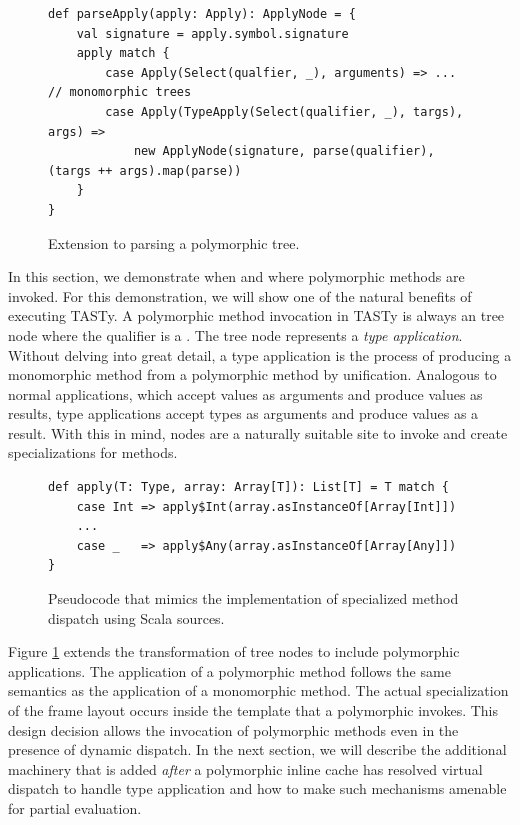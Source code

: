 \begin{figure}[!htb]
\begin{verbatim}
def parseApply(apply: Apply): ApplyNode = {
	val signature = apply.symbol.signature
	apply match {
		case Apply(Select(qualfier, _), arguments) => ... // monomorphic trees
		case Apply(TypeApply(Select(qualifier, _), targs), args) =>
			new ApplyNode(signature, parse(qualifier), (targs ++ args).map(parse))
	}
}
\end{verbatim}
\caption{Extension to parsing a polymorphic  tree.}
\label{impl:parse-typeapply}
\end{figure}

In this section, we demonstrate when and where polymorphic methods are invoked.
For this demonstration, we will show one of the natural benefits of executing TASTy.
A polymorphic method invocation in TASTy is always an  tree node where the qualifier is a .
The  tree node represents a \textit{type application}.
Without delving into great detail, a type application is the process of producing a monomorphic method from a polymorphic method by unification.
Analogous to normal applications, which accept values as arguments and produce values as results, type applications accept types as arguments and produce values as a result.
With this in mind,  nodes are a naturally suitable site to invoke and create specializations for methods.

\begin{figure}[!htb]
\begin{verbatim}
def apply(T: Type, array: Array[T]): List[T] = T match {
	case Int => apply$Int(array.asInstanceOf[Array[Int]])
	...
	case _   => apply$Any(array.asInstanceOf[Array[Any]])
}
\end{verbatim}
\caption{Pseudocode that mimics the implementation of specialized method dispatch using Scala sources.}
\end{figure}

Figure \ref{impl:parse-typeapply} extends the transformation of  tree nodes to include polymorphic applications.
The application of a polymorphic method follows the same semantics as the application of a monomorphic method.
The actual specialization of the frame layout occurs inside the template that a polymorphic  invokes.
This design decision allows the invocation of polymorphic methods even in the presence of dynamic dispatch.
In the next section, we will describe the additional machinery that is added \textit{after} a polymorphic inline cache has resolved virtual dispatch to handle type application and how to make such mechanisms amenable for partial evaluation.

